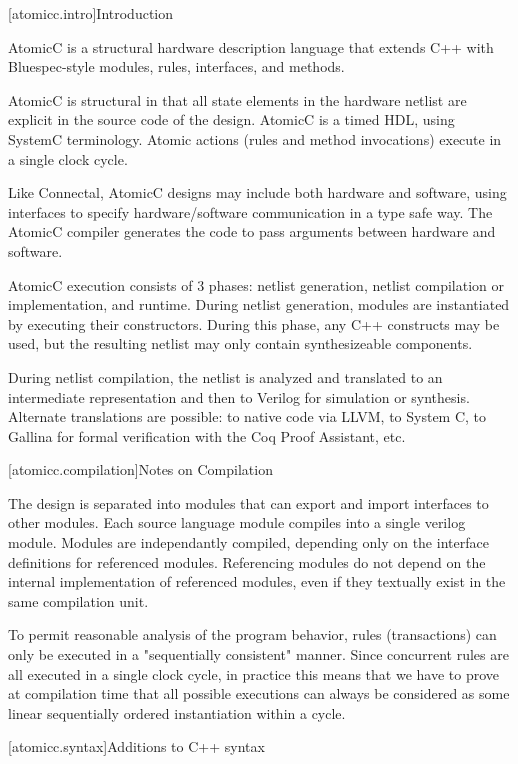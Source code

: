 [atomicc.intro]{Introduction}

AtomicC is a structural hardware description language that extends C++
with Bluespec-style modules, rules, interfaces, and methods.

AtomicC is structural in that all state elements in the hardware
netlist are explicit in the source code of the design. AtomicC is a
timed HDL, using SystemC terminology. Atomic actions (rules and method
invocations) execute in a single clock cycle.

Like Connectal, AtomicC designs may include both hardware and
software, using interfaces to specify hardware/software communication
in a type safe way. The AtomicC compiler generates the code to pass
arguments between hardware and software.

AtomicC execution consists of 3 phases: netlist generation, netlist
compilation or implementation, and runtime.  During netlist
generation, modules are instantiated by executing their
constructors. During this phase, any C++ constructs may be used, but
the resulting netlist may only contain synthesizeable components.

During netlist compilation, the netlist is analyzed and translated to
an intermediate representation and then to Verilog for simulation or
synthesis. Alternate translations are possible: to native code via
LLVM, to System C, to Gallina for formal verification with the Coq
Proof Assistant, etc.


[atomicc.compilation]{Notes on Compilation}

The design is separated into modules that can export and import interfaces to other modules.
Each source language module compiles into a single verilog module.  Modules are independantly
compiled, depending only on the interface definitions for referenced modules.
Referencing modules do not depend on the internal implementation of referenced modules,
even if they textually exist in the same compilation unit.

To permit reasonable analysis of the program behavior, rules (transactions) can only be
executed in a "sequentially consistent" manner.  Since concurrent rules are all executed in a
single clock cycle, in practice this means that we have to prove at compilation time that
all possible executions can always be considered as some linear sequentially ordered instantiation
within a cycle.

[atomicc.syntax]{Additions to C++ syntax}

